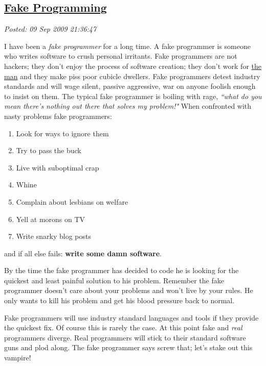 %

\subsection*{\href{http://bakerjd99.wordpress.com/2009/09/09/fake-progamming/}{Fake Programming}}


\noindent\emph{Posted: 09 Sep 2009 21:36:47}
\vspace{6pt}

I have been a \emph{fake programmer} for a long time. A fake programmer
is someone who writes software to crush personal irritants. Fake
programmers are not hackers; they don't enjoy the process of software
creation; they don't work for
\href{http://en.wikipedia.org/wiki/The\_Man} {the man} and they make piss
poor cubicle dwellers. Fake programmers detest industry standards and
will wage silent, passive aggressive, war on anyone foolish enough to
insist on them. The typical fake programmer is boiling with rage,
\emph{``what do you mean there's nothing out there that solves my
problem!"} When confronted with nasty problems fake programmers:

\begin{enumerate}
\item
  Look for ways to ignore them
\item
  Try to pass the buck
\item
  Live with suboptimal crap
\item
  Whine
\item
  Complain about lesbians on welfare
\item
  Yell at morons on TV
\item
  Write snarky blog posts
\end{enumerate}
and if all else fails: \textbf{write some damn software}.

By the time the fake programmer has decided to code he is looking for
the quickest and least painful solution to his problem. Remember the
fake programmer doesn't care about your problems and won't live by your
rules. He only wants to kill his problem and get his blood pressure back
to normal.

Fake programmers will use industry standard languages and tools if they
provide the quickest fix. Of course this is rarely the case. At this
point fake and \emph{real} programmers diverge. Real programmers will
stick to their standard software guns and plod along. The fake
programmer says screw that; let's stake out this vampire!

